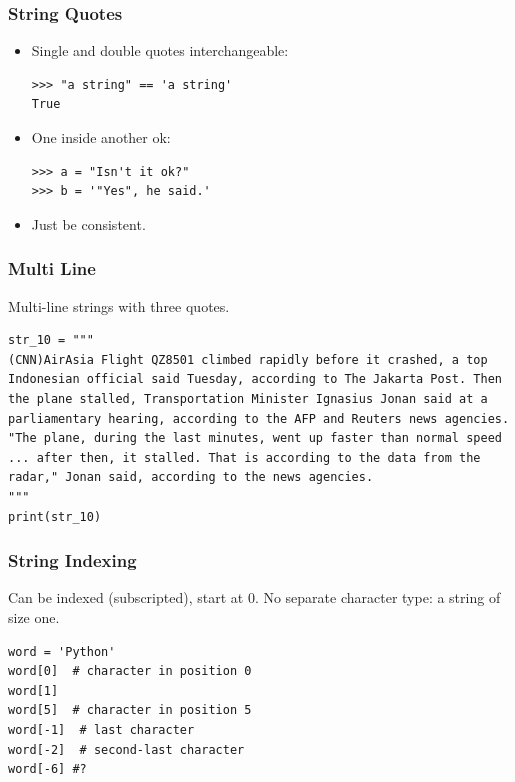


\begin{frame}[fragile]\frametitle{String Quotes}
\begin{itemize}
\item  Single and double quotes interchangeable:
\begin{lstlisting}
>>> "a string" == 'a string'
True
\end{lstlisting}
\item One inside another ok:
\begin{lstlisting}
>>> a = "Isn't it ok?"
>>> b = '"Yes", he said.'
\end{lstlisting}
\item Just be consistent.
\end{itemize}
\end{frame}

\begin{frame}[fragile] \frametitle{Multi Line}
Multi-line strings with three quotes.
\begin{lstlisting}[showstringspaces=false]
str_10 = """
(CNN)AirAsia Flight QZ8501 climbed rapidly before it crashed, a top Indonesian official said Tuesday, according to The Jakarta Post. Then the plane stalled, Transportation Minister Ignasius Jonan said at a parliamentary hearing, according to the AFP and Reuters news agencies. "The plane, during the last minutes, went up faster than normal speed ... after then, it stalled. That is according to the data from the radar," Jonan said, according to the news agencies.
"""
print(str_10)
\end{lstlisting}
\end{frame}

\begin{frame}[fragile]\frametitle{String Indexing}
Can be indexed (subscripted), start at 0. No separate character type: a string of size one.
\begin{lstlisting}
word = 'Python'
word[0]  # character in position 0
word[1]
word[5]  # character in position 5
word[-1]  # last character
word[-2]  # second-last character
word[-6] #?
\end{lstlisting}
\end{frame}

